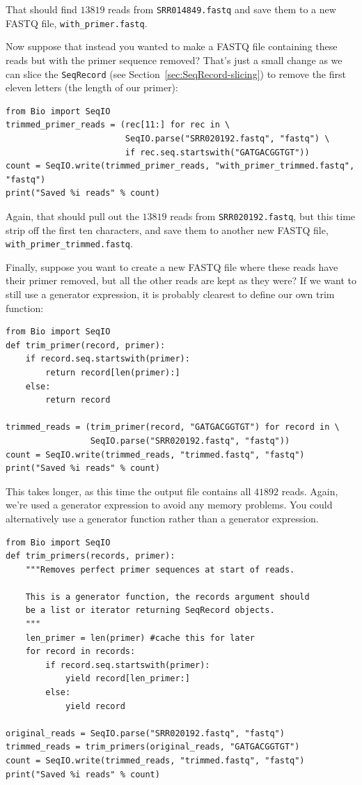\documentclass{report}
\begin{document}
\noindent That should find $13819$ reads from \texttt{SRR014849.fastq} and save them to
a new FASTQ file, \texttt{with\_primer.fastq}.

Now suppose that instead you wanted to make a FASTQ file containing these reads
but with the primer sequence removed?  That's just a small change as we can slice the
\verb|SeqRecord| (see Section~\ref{sec:SeqRecord-slicing}) to remove the first eleven
letters (the length of our primer):

\begin{verbatim}
from Bio import SeqIO
trimmed_primer_reads = (rec[11:] for rec in \
                        SeqIO.parse("SRR020192.fastq", "fastq") \
                        if rec.seq.startswith("GATGACGGTGT"))
count = SeqIO.write(trimmed_primer_reads, "with_primer_trimmed.fastq", "fastq")
print("Saved %i reads" % count)
\end{verbatim}

\noindent Again, that should pull out the $13819$ reads from \texttt{SRR020192.fastq},
but this time strip off the first ten characters, and save them to another new
FASTQ file, \texttt{with\_primer\_trimmed.fastq}.

Finally, suppose you want to create a new FASTQ file where these reads have
their primer removed, but all the other reads are kept as they were?
If we want to still use a generator expression, it is probably clearest to
define our own trim function:

\begin{verbatim}
from Bio import SeqIO
def trim_primer(record, primer):
    if record.seq.startswith(primer):
        return record[len(primer):]
    else:
        return record

trimmed_reads = (trim_primer(record, "GATGACGGTGT") for record in \
                 SeqIO.parse("SRR020192.fastq", "fastq"))
count = SeqIO.write(trimmed_reads, "trimmed.fastq", "fastq")
print("Saved %i reads" % count)
\end{verbatim}

This takes longer, as this time the output file contains all $41892$ reads.
Again, we're used a generator expression to avoid any memory problems.
You could alternatively use a generator function rather than a generator
expression.

\begin{verbatim}
from Bio import SeqIO
def trim_primers(records, primer):
    """Removes perfect primer sequences at start of reads.
    
    This is a generator function, the records argument should
    be a list or iterator returning SeqRecord objects.
    """
    len_primer = len(primer) #cache this for later
    for record in records:
        if record.seq.startswith(primer):
            yield record[len_primer:]
        else:
            yield record

original_reads = SeqIO.parse("SRR020192.fastq", "fastq")
trimmed_reads = trim_primers(original_reads, "GATGACGGTGT")
count = SeqIO.write(trimmed_reads, "trimmed.fastq", "fastq") 
print("Saved %i reads" % count)
\end{verbatim}
\end{document}
